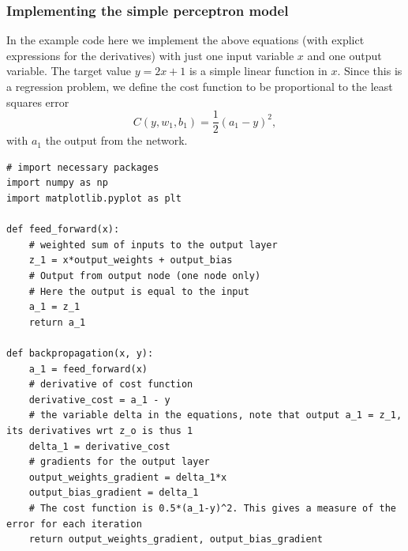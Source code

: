 \documentclass{beamer}
\begin{document}
\begin{frame}
\frametitle{Implementing the simple perceptron model}

In the example code here we implement the above equations (with explict
expressions for the derivatives) with just one input variable $x$ and
one output variable.  The target value $y=2x+1$ is a simple linear
function in $x$. Since this is a regression problem, we define the cost function to be proportional to the least squares error
\[
C(y,w_1,b_1)=\frac{1}{2}(a_1-y)^2,
\]
with $a_1$ the output from the network.





















































\begin{verbatim}
# import necessary packages
import numpy as np
import matplotlib.pyplot as plt

def feed_forward(x):
    # weighted sum of inputs to the output layer
    z_1 = x*output_weights + output_bias
    # Output from output node (one node only)
    # Here the output is equal to the input
    a_1 = z_1
    return a_1

def backpropagation(x, y):
    a_1 = feed_forward(x)
    # derivative of cost function
    derivative_cost = a_1 - y
    # the variable delta in the equations, note that output a_1 = z_1, its derivatives wrt z_o is thus 1
    delta_1 = derivative_cost
    # gradients for the output layer
    output_weights_gradient = delta_1*x
    output_bias_gradient = delta_1
    # The cost function is 0.5*(a_1-y)^2. This gives a measure of the error for each iteration
    return output_weights_gradient, output_bias_gradient


\end{verbatim}
\end{frame}
\end{document}
